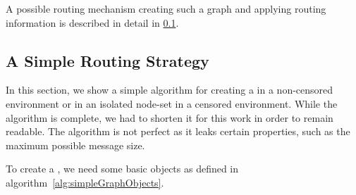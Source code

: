 A possible routing mechanism creating such a graph and applying routing information is described in detail in \cref{sec:simpleRoutingStrategy}.

\subsection{A Simple Routing Strategy}\label{sec:simpleRoutingStrategy}
In this section, we show a simple algorithm for creating a  in a non-censored environment or in an isolated node-set in a censored environment. While the algorithm is complete, we had to shorten it for this work in order to remain readable. The algorithm is not perfect as it leaks certain properties, such as the maximum possible message size.

To create a , we need some basic objects as defined in algorithm~\ref{alg:simpleGraphObjects}.
